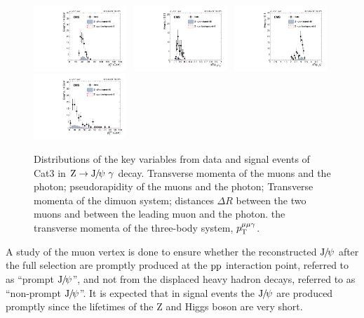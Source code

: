 \begin{figure}[h]
		  \includegraphics[width=0.31\textwidth]{Fig/Final_NoPreliminary/ZJpsiG/pTmumu_EE}~
		  \includegraphics[width=0.31\textwidth]{Fig/Final_NoPreliminary/ZJpsiG/delR_Muons_EE}~
		  \includegraphics[width=0.31\textwidth]{Fig/Final_NoPreliminary/ZJpsiG/delR_leMuPho_EE}\\
		  \includegraphics[width=0.31\textwidth]{Fig/Final_NoPreliminary/ZJpsiG/pTmmg_EE}\\
		  \caption{Distributions of the key variables from data and signal events of Cat3 in $\cPZ\to\JPsi\ \gamma$ decay.
		    Transverse momenta of the muons and the photon;
		    pseudorapidity of the muons and the photon;
		    Transverse momenta of the dimuon system;
		    distances $\Delta R$ between the two muons and between the leading muon and the photon.
		    the transverse momenta of the three-body system, $p_{\mathrm{T}}^{\mu\mu\gamma}$.}
		  \label{fig:dist-6}
		\end{figure}
		\clearpage

		A study of the muon vertex is done to ensure whether the reconstructed ${\mathrm{J}\hspace{-.08em}/\hspace{-.14em}\psi}$ after the full selection are promptly produced at the $\mathrm{p}\mathrm{p}$ interaction point, referred to as ``prompt ${\mathrm{J}\hspace{-.08em}/\hspace{-.14em}\psi}$'', and not from the displaced heavy hadron decays, referred to as ``non-prompt ${\mathrm{J}\hspace{-.08em}/\hspace{-.14em}\psi}$''. It is expected that in signal events the ${\mathrm{J}\hspace{-.08em}/\hspace{-.14em}\psi}$ are produced promptly since the lifetimes of the Z and Higgs boson are very short. 

